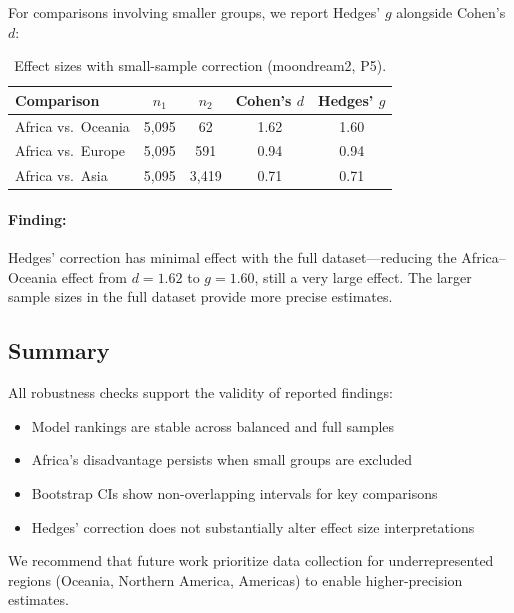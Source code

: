 \documentclass{article}
\newcommand{\probe}[1]{\textsc{P#1}}
\begin{document}
For comparisons involving smaller groups, we report Hedges' $g$ alongside Cohen's $d$:

\begin{table}[h]
\centering
\caption{Effect sizes with small-sample correction (moondream2, \probe{5}).}
\small
\begin{tabular}{lcccc}
\toprule
\textbf{Comparison} & $n_1$ & $n_2$ & \textbf{Cohen's $d$} & \textbf{Hedges' $g$} \\
\midrule
Africa vs.\ Oceania & 5{,}095 & 62 & 1.62 & 1.60 \\
Africa vs.\ Europe & 5{,}095 & 591 & 0.94 & 0.94 \\
Africa vs.\ Asia & 5{,}095 & 3{,}419 & 0.71 & 0.71 \\
\bottomrule
\end{tabular}
\end{table}

\paragraph{Finding:} Hedges' correction has minimal effect with the full dataset---reducing the Africa--Oceania effect from $d=1.62$ to $g=1.60$, still a very large effect. The larger sample sizes in the full dataset provide more precise estimates.

\subsection{Summary}

All robustness checks support the validity of reported findings:
\begin{itemize}[nosep,leftmargin=*]
    \item Model rankings are stable across balanced and full samples
    \item Africa's disadvantage persists when small groups are excluded
    \item Bootstrap CIs show non-overlapping intervals for key comparisons
    \item Hedges' correction does not substantially alter effect size interpretations
\end{itemize}

We recommend that future work prioritize data collection for underrepresented regions (Oceania, Northern America, Americas) to enable higher-precision estimates.
\end{document}
